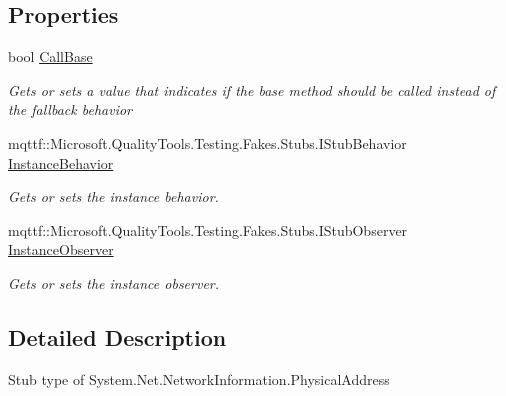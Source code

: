 \subsection*{Properties}
\begin{DoxyCompactItemize}
\item 
bool \hyperlink{class_system_1_1_net_1_1_network_information_1_1_fakes_1_1_stub_physical_address_a3d219d745a7f90e7236765208b144bc1}{Call\-Base}
\begin{DoxyCompactList}\small\item\em Gets or sets a value that indicates if the base method should be called instead of the fallback behavior\end{DoxyCompactList}\item 
mqttf\-::\-Microsoft.\-Quality\-Tools.\-Testing.\-Fakes.\-Stubs.\-I\-Stub\-Behavior \hyperlink{class_system_1_1_net_1_1_network_information_1_1_fakes_1_1_stub_physical_address_aebb8307e9ab056c3b80cbc5e2327793b}{Instance\-Behavior}
\begin{DoxyCompactList}\small\item\em Gets or sets the instance behavior.\end{DoxyCompactList}\item 
mqttf\-::\-Microsoft.\-Quality\-Tools.\-Testing.\-Fakes.\-Stubs.\-I\-Stub\-Observer \hyperlink{class_system_1_1_net_1_1_network_information_1_1_fakes_1_1_stub_physical_address_a38fbfc57caa91894dae185282fb54d28}{Instance\-Observer}
\begin{DoxyCompactList}\small\item\em Gets or sets the instance observer.\end{DoxyCompactList}\end{DoxyCompactItemize}


\subsection{Detailed Description}
Stub type of System.\-Net.\-Network\-Information.\-Physical\-Address



